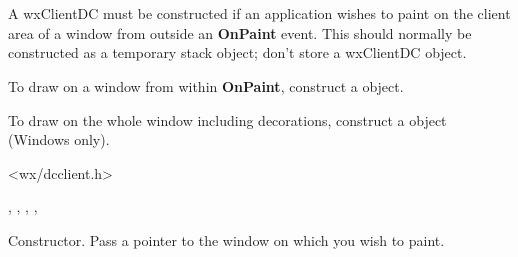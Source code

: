 \section{}\label{wxclientdc}

A wxClientDC must be constructed if an application wishes to paint on the
client area of a window from outside an {\bf OnPaint} event.
This should normally be constructed as a temporary stack object; don't store
a wxClientDC object.

To draw on a window from within {\bf OnPaint}, construct a  object.

To draw on the whole window including decorations, construct a  object
(Windows only).




<wx/dcclient.h>


, , ,\rtfsp
{}, 




Constructor. Pass a pointer to the window on which you wish to paint.



